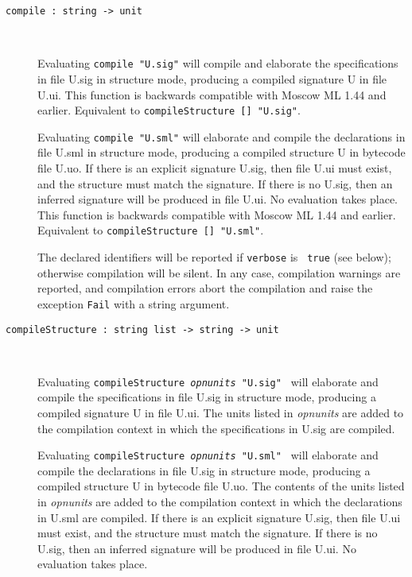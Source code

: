\documentclass[fleqn]{article}
\begin{document}
\begin{description}

\item[{\tt compile :\ string -> unit}]\mbox{ }
  
  Evaluating {\tt compile "{\rm U.sig}"} will compile and elaborate
  the specifications in file U.sig in structure mode, producing a
  compiled signature U in file U.ui.  This function is backwards
  compatible with Moscow ML 1.44 and earlier.  Equivalent to
  \texttt{compileStructure [] "{\rm U.sig}"}.
  
  Evaluating {\tt compile "{\rm U.sml}"} will elaborate and compile
  the declarations in file U.sml in structure mode, producing a
  compiled structure U in bytecode file U.uo.  If there is an explicit
  signature U.sig, then file U.ui must exist, and the structure must
  match the signature.  If there is no U.sig, then an inferred
  signature will be produced in file U.ui.  No evaluation takes place.
  This function is backwards compatible with Moscow ML 1.44 and
  earlier.  Equivalent to \texttt{compileStructure [] "{\rm U.sml}"}.

  The declared identifiers will be reported if {\tt verbose} is {\tt
    true} (see below); otherwise compilation will be silent.  In any
    case, compilation warnings are reported, and compilation errors
    abort the compilation and raise the exception {\tt Fail} with a
    string argument.

\item[{\tt compileStructure :\ string list -> string -> unit}]\mbox{ }
  
  Evaluating \texttt{compileStructure \textit{opnunits} "{\rm U.sig}"
    } will elaborate and compile the specifications in file U.sig in
  structure mode, producing a compiled signature U in file U.ui.  The
  units listed in \textit{opnunits} are added to the compilation
  context in which the specifications in U.sig are compiled.  
  
  Evaluating \texttt{compileStructure \textit{opnunits} "{\rm U.sml}"
    } will elaborate and compile the declarations in file U.sig in
  structure mode, producing a compiled structure U in bytecode file
  U.uo.  The contents of the units listed in \textit{opnunits} are
  added to the compilation context in which the declarations in U.sml
  are compiled.  If there is an explicit signature U.sig, then file
  U.ui must exist, and the structure must match the signature.  If
  there is no U.sig, then an inferred signature will be produced in
  file U.ui.  No evaluation takes place.



\end{description}
\end{document}
